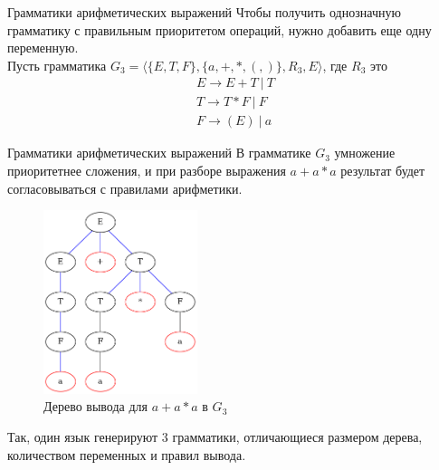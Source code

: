 \documentclass{beamer}
\begin{document}
	\begin{frame}{Грамматики арифметических выражений}
	Чтобы получить однозначную грамматику с правильным приоритетом операций, нужно добавить еще одну переменную.\\
	\vspace{3mm}
	Пусть грамматика $G_3=\langle\{E,T,F\}, \{a,+,*,(,)\}, R_3, E\rangle$, где $R_3$ это 
	    \begin{gather}
         E \to E + T \ |\ T \nonumber \\
         T \to T * F \ |\  F  \nonumber \\
         F \to (E) \ |\  a  \nonumber
        \end{gather}
	
	\end{frame}
    \begin{frame}{Грамматики арифметических выражений}
    В грамматике $G_3$ умножение приоритетнее сложения, и при разборе выражения $a+a*a$ результат будет согласовываться с правилами арифметики.
       \begin{figure}[!tbp]
          \centering
            \includegraphics[width=0.4\textwidth]{g3_ex.png}
          \caption{Дерево вывода для $a+a*a$ в $G_3$}
        \end{figure}
   Так, один язык генерируют 3 грамматики, отличающиеся размером дерева, количеством переменных и правил вывода. 
   \end{frame}
    
\end{document}
